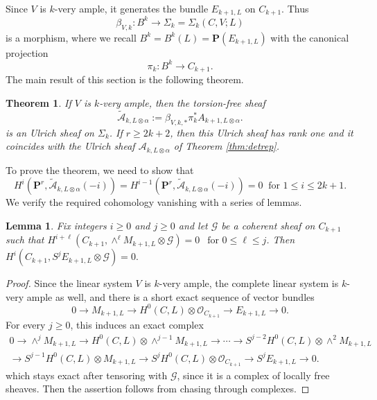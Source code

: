 \documentclass[12pt]{amsart}
\newcounter{thmcounter}
\numberwithin{equation}{section}
\numberwithin{thmcounter}{section}
\newtheorem{theorem}[thmcounter]{Theorem}
\newtheorem{lemma}[thmcounter]{Lemma}
\theoremstyle{definition}
\theoremstyle{claim}
\newcommand{\nP}{\mathbf{P}}
\newcommand{\sA}{\mathscr{A}}
\newcommand{\sO}{\mathscr{O}}
\begin{document}
\medskip

Since $V$ is $k$-very ample, it generates the bundle $E_{k+1,L}$ on $C_{k+1}$. Thus
$$
\beta_{V, k} \colon B^k \longrightarrow \Sigma_k = \Sigma_k(C, V; L)
$$
is a morphism, where we recall $B^k=B^k(L)=\nP(E_{k+1,L})$ with the canonical projection
$$
\pi_k \colon B^k \longrightarrow C_{k+1}.
$$
The main result of this section is the following theorem.

\begin{theorem}\label{thm:ulrichdeg>=2g+2k+1}
If $V$ is $k$-very ample, then the torsion-free sheaf 
$$
\widetilde{\mathscr{A}}_{k, L \otimes \alpha}:=\beta_{V,k,*} \pi_k^* A_{k+1,L \otimes \alpha}.
$$
is an Ulrich sheaf on $\Sigma_k$. If $r \geq 2k+2$, then this Ulrich sheaf has rank one and it coincides with the Ulrich sheaf $\sA_{k,L\otimes \alpha}$ of Theorem \ref{thm:detrep}.
\end{theorem}

To prove the theorem, we need to show that
$$
H^i(\nP^r, \widetilde{\mathscr{A}}_{k, L \otimes \alpha}(-i))=H^{i-1}(\nP^r, \widetilde{\mathscr{A}}_{k, L \otimes \alpha}(-i))=0~\text{ for $1 \leq i \leq 2k+1$}.
$$
We verify the required cohomology vanishing with a series of lemmas. 

\begin{lemma}\label{lemma:vanishingwedgeM}
Fix integers $i \geq 0$ and $j \geq 0$ and let $\mathscr{G}$ be a coherent sheaf on $C_{k+1}$ such that
$
H^{i+\ell}(C_{k+1},\wedge^{\ell} M_{k+1,L}\otimes \mathscr{G})=0 ~~\text{ for $0 \leq \ell \leq j$}
$.
Then
$
H^i(C_{k+1}, S^j E_{k+1,L} \otimes \mathscr{G})=0.
$
\end{lemma}

\begin{proof}
Since the linear system $V$ is  $k$-very ample, the complete linear system is $k$-very ample as well, and there is a short exact sequence of vector bundles
$$
0 \longrightarrow  M_{k+1,L} \longrightarrow  H^0(C,L)\otimes \sO_{C_{k+1}} \longrightarrow  E_{k+1,L} \to 0.
$$
For every $j \geq 0$, this induces an exact complex
\begin{multline*}
0 \longrightarrow \wedge^j M_{k+1,L} \longrightarrow H^0(C,L) \otimes \wedge^{j-1} M_{k+1,L} \longrightarrow
\cdots
\longrightarrow  S^{j-2} H^0(C,L) \otimes \wedge^{2} M_{k+1,L} \\
\longrightarrow  S^{j-1}H^0(C,L) \otimes M_{k+1,L}
\longrightarrow  S^j H^0(C,L) \otimes \sO_{C_{k+1}} \longrightarrow S^j E_{k+1,L} \longrightarrow 0.
\end{multline*}
which stays exact after tensoring with $\mathscr{G}$, since it is a complex of locally free sheaves.  Then the assertion follows from chasing through complexes.
\end{proof}
\end{document}
